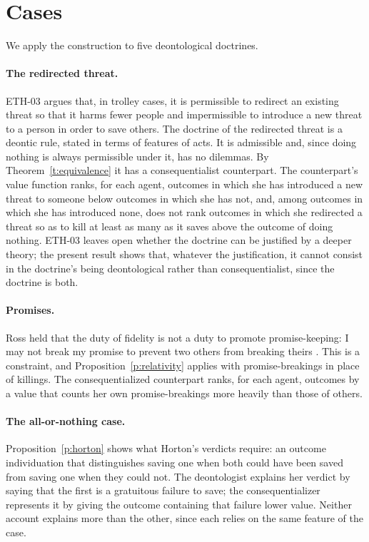 \documentclass{situationist-preprint}
\begin{document}
\section{Cases}\label{s:cases}

We apply the construction to five deontological doctrines.

\paragraph{The redirected threat.} ETH-03 argues that, in trolley cases, it is permissible to redirect an existing threat so that it harms fewer people and impermissible to introduce a new threat to a person in order to save others. The doctrine of the redirected threat is a deontic rule, stated in terms of features of acts. It is admissible and, since doing nothing is always permissible under it, has no dilemmas. By Theorem~\ref{t:equivalence} it has a consequentialist counterpart. The counterpart's value function ranks, for each agent, outcomes in which she has introduced a new threat to someone below outcomes in which she has not, and, among outcomes in which she has introduced none, does not rank outcomes in which she redirected a threat so as to kill at least as many as it saves above the outcome of doing nothing. ETH-03 leaves open whether the doctrine can be justified by a deeper theory; the present result shows that, whatever the justification, it cannot consist in the doctrine's being deontological rather than consequentialist, since the doctrine is both.

\paragraph{Promises.} Ross held that the duty of fidelity is not a duty to promote promise-keeping: I may not break my promise to prevent two others from breaking theirs \citep{Ross1930}. This is a constraint, and Proposition~\ref{p:relativity} applies with promise-breakings in place of killings. The consequentialized counterpart ranks, for each agent, outcomes by a value that counts her own promise-breakings more heavily than those of others.

\paragraph{The all-or-nothing case.} Proposition~\ref{p:horton} shows what Horton's verdicts require: an outcome individuation that distinguishes saving one when both could have been saved from saving one when they could not. The deontologist explains her verdict by saying that the first is a gratuitous failure to save; the consequentializer represents it by giving the outcome containing that failure lower value. Neither account explains more than the other, since each relies on the same feature of the case.
\end{document}
